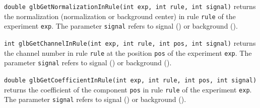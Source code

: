 \begin{function}
{\tt double glbGetNormalizationInRule(int exp, int rule, int signal)}
returns the normalization (normalization or background center)
in rule {\tt rule} of the experiment {\tt exp}.
The parameter {\tt signal} refers to signal () or background
().
\end{function}
\begin{function}
{\tt int glbGetChannelInRule(int exp, int rule, int pos, int signal)}
returns the channel number in rule {\tt rule} at the position {\tt pos}
of the experiment {\tt exp}.
The parameter {\tt signal} refers to signal () or background
().
\end{function}
\begin{function}
{\tt double glbGetCoefficientInRule(int exp, int rule, int pos, int signal)}
returns the coefficient of the component {\tt pos} in rule {\tt rule} 
of the experiment {\tt exp}.
The parameter {\tt signal} refers to signal () or background
().
\end{function}


